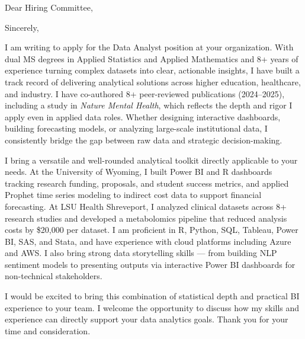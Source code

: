 \documentclass[11pt,a4paper,roman]{moderncv}
\begin{document}
\opening{Dear Hiring Committee,}
\closing{Sincerely,}
\makelettertitle

I am writing to apply for the Data Analyst position at your organization. With dual MS degrees in Applied Statistics and Applied Mathematics and 8+ years of experience turning complex datasets into clear, actionable insights, I have built a track record of delivering analytical solutions across higher education, healthcare, and industry. I have co-authored 8+ peer-reviewed publications (2024--2025), including a study in \textit{Nature Mental Health}, which reflects the depth and rigor I apply even in applied data roles. Whether designing interactive dashboards, building forecasting models, or analyzing large-scale institutional data, I consistently bridge the gap between raw data and strategic decision-making.

I bring a versatile and well-rounded analytical toolkit directly applicable to your needs. At the University of Wyoming, I built Power BI and R dashboards tracking research funding, proposals, and student success metrics, and applied Prophet time series modeling to indirect cost data to support financial forecasting. At LSU Health Shreveport, I analyzed clinical datasets across 8+ research studies and developed a metabolomics pipeline that reduced analysis costs by \$20,000 per dataset. I am proficient in R, Python, SQL, Tableau, Power BI, SAS, and Stata, and have experience with cloud platforms including Azure and AWS. I also bring strong data storytelling skills --- from building NLP sentiment models to presenting outputs via interactive Power BI dashboards for non-technical stakeholders.

I would be excited to bring this combination of statistical depth and practical BI experience to your team. I welcome the opportunity to discuss how my skills and experience can directly support your data analytics goals. Thank you for your time and consideration.

\vspace{0.5cm}

\makeletterclosing
\end{document}
